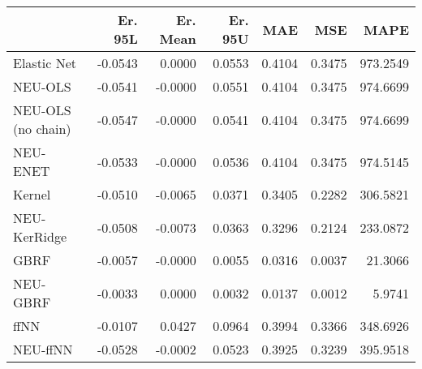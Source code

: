 \begin{tabular}{lrrrrrr}
\toprule
{} &  Er. 95L &  Er. Mean &  Er. 95U &    MAE &    MSE &     MAPE \\
\midrule
Elastic Net        &  -0.0543 &    0.0000 &   0.0553 & 0.4104 & 0.3475 & 973.2549 \\
NEU-OLS            &  -0.0541 &   -0.0000 &   0.0551 & 0.4104 & 0.3475 & 974.6699 \\
NEU-OLS (no chain) &  -0.0547 &   -0.0000 &   0.0541 & 0.4104 & 0.3475 & 974.6699 \\
NEU-ENET           &  -0.0533 &   -0.0000 &   0.0536 & 0.4104 & 0.3475 & 974.5145 \\
Kernel             &  -0.0510 &   -0.0065 &   0.0371 & 0.3405 & 0.2282 & 306.5821 \\
NEU-KerRidge       &  -0.0508 &   -0.0073 &   0.0363 & 0.3296 & 0.2124 & 233.0872 \\
GBRF               &  -0.0057 &   -0.0000 &   0.0055 & 0.0316 & 0.0037 &  21.3066 \\
NEU-GBRF           &  -0.0033 &    0.0000 &   0.0032 & 0.0137 & 0.0012 &   5.9741 \\
ffNN               &  -0.0107 &    0.0427 &   0.0964 & 0.3994 & 0.3366 & 348.6926 \\
NEU-ffNN           &  -0.0528 &   -0.0002 &   0.0523 & 0.3925 & 0.3239 & 395.9518 \\
\bottomrule
\end{tabular}
